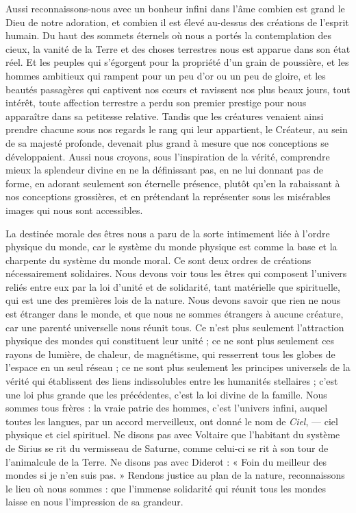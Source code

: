 \documentclass[a4paper, 11pt, oneside, landscape]{article}
\begin{document}
Aussi reconnaissons-nous avec un bonheur infini dans l'âme combien est grand le Dieu de notre adoration, et combien il est élevé au-dessus des créations de l'esprit humain. Du haut des sommets éternels où nous a portés la contemplation des cieux, la vanité de la Terre et des choses terrestres nous est apparue dans son état réel. Et les peuples qui s'égorgent pour la propriété d'un grain de poussière, et les hommes ambitieux qui rampent pour un peu d'or ou un peu de gloire, et les beautés passagères qui captivent nos cœurs et ravissent nos plus beaux jours, tout intérêt, toute affection terrestre a perdu son premier prestige pour nous apparaître dans sa petitesse relative. Tandis que les créatures venaient ainsi prendre chacune sous nos regards le rang qui leur appartient, le Créateur, au sein de sa majesté profonde, devenait plus grand à mesure que nos conceptions se développaient. Aussi nous croyons, sous l'inspiration de la vérité, comprendre mieux la splendeur divine en ne la définissant pas, en ne lui donnant pas de forme, en adorant seulement son éternelle présence, plutôt qu'en la rabaissant à nos conceptions grossières, et en prétendant la représenter sous les misérables images qui nous sont accessibles.

La destinée morale des êtres nous a paru de la sorte intimement liée à l'ordre physique du monde, car le système du monde physique est comme la base et la charpente du système du monde moral. Ce sont deux ordres de créations nécessairement solidaires. Nous devons voir tous les êtres qui composent l'univers reliés entre eux par la loi d'unité et de solidarité, tant matérielle que spirituelle, qui est une des premières lois de la nature. Nous devons savoir que rien ne nous est étranger dans le monde, et que nous ne sommes étrangers à aucune créature, car une parenté universelle nous réunit tous. Ce n'est plus seulement l'attraction physique des mondes qui constituent leur unité ; ce ne sont plus seulement ces rayons de lumière, de chaleur, de magnétisme, qui resserrent tous les globes de l'espace en un seul réseau ; ce ne sont plus seulement les principes universels de la vérité qui établissent des liens indissolubles entre les humanités stellaires ; c'est une loi plus grande que les précédentes, c'est la loi divine de la famille. Nous sommes tous frères : la vraie patrie des hommes, c'est l'univers infini, auquel toutes les langues, par un accord merveilleux, ont donné le nom de \emph{Ciel}, --- ciel physique et ciel spirituel. Ne disons pas avec Voltaire que l'habitant du système de Sirius se rit du vermisseau de Saturne, comme celui-ci se rit à son tour de l'animalcule de la Terre. Ne disons pas avec Diderot : « Foin du meilleur des mondes si je n'en suis pas. » Rendons justice au plan de la nature, reconnaissons le lieu où nous sommes : que l'immense solidarité qui réunit tous les mondes laisse en nous l'impression de sa grandeur.
\end{document}
